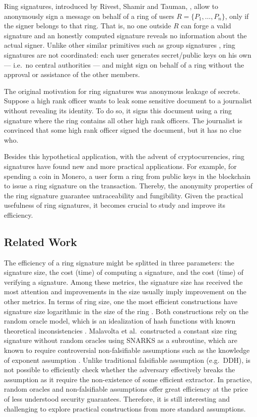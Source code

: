 
Ring signatures, introduced by Rivest, Shamir and Tauman, \cite{AC:RivShaTau01}, allow to anonymously sign a message on behalf of a ring of users $R=\{P_1,\ldots,P_n\}$, only if the signer belongs to that ring. That is, no one outside $R$ can forge a valid signature and  an honestly computed signature reveals no information about the actual signer.  
Unlike other similar primitives such as group signatures \cite{EC:ChaVan91}, ring signatures are not coordinated: each user generates secret/public keys on his own --- i.e.~no central authorities --- and might sign on behalf of a ring without the approval or assistance of the other members.

The original motivation for ring signatures was anonymous leakage of secrets. Suppose a high rank officer wants to leak some sensitive document to a journalist without revealing its identity. To do so, it signs this document using a ring signature where the ring contains all other high rank officers. The journalist is convinced that some high rank officer signed the document, but it has no clue who.

Besides this hypothetical application, with the advent of cryptocurrencies, ring signatures have found new and more practical applications. For example, for spending a coin in Monero, a user form a ring from public keys in the blockchain to issue a ring signature on the transaction. Thereby, the anonymity properties of the ring signature guarantee untraceability and fungibility. 
Given the practical usefulness of ring signatures, it becomes crucial to study and improve its efficiency.

\subsection{Related Work}
The efficiency of a ring signature might be splitted in three parameters: the signature size, the cost (time) of computing a signature, and the cost (time) of verifying a signature. Among these metrics, the signature size has received the most attention and improvements in the size usually imply improvement on the other metrics.
In terms of ring size, one the most efficient constructions have signature size logarithmic in the size of the ring \cite{EC:GroKoh15,EC:LLNW16}. Both constructions rely on the {random oracle model}, which is an idealization of hash functions with known theoretical inconsistencies \cite{FOCS:GolKal03}. Malavolta et al.~constructed a constant size ring signature without random oracles \cite{AC:MalSch17} using SNARKS \cite{EC:GGPR13,AC:DFGK14,EC:Groth16} as a subroutine, which are known to require controversial non-falsifiable assumptions such as the knowledge of exponent assumption  \cite{STOC:GenWic11,C:Naor03}. Unlike traditional falsifiable assumption (e.g.~DDH), is not possible to efficiently check whether the adversary effectively breaks the assumption as it require the non-existence of some efficient extractor. In practice, random oracles and non-falsifiable assumptions offer great efficiency at the price of less understood security guarantees. Therefore, it is still interesting and challenging to explore practical constructions from more standard assumptions.

